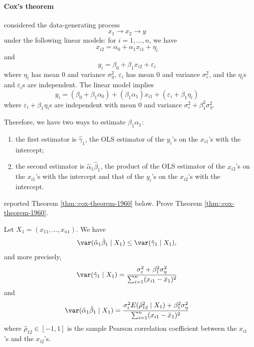 \paragraph{Cox's theorem}\label{hw11::cox-theorem1960}


\citet{cox1960jrssb} considered the data-generating process
$$
x_1 \longrightarrow x_2  \longrightarrow y
$$
under the following linear models:
for $i=1,\ldots, n$, we have 
$$
x_{i2} = \alpha_0 + \alpha_1x_{i1} + \eta_i
$$
and
$$
y_i = \beta_0 + \beta_1 x_{i2} + \varepsilon_i
$$
where $\eta_i$ has mean 0 and variance $\sigma_\eta^2$, $\varepsilon_i$ has mean 0 and variance $\sigma_\varepsilon^2$, and the $\eta_i$s and  $\varepsilon_i$s are independent.
The linear model implies
$$
y_i = (\beta_0 + \beta_1\alpha_0) + (\beta_1 \alpha_1) x_{i1} +   (\varepsilon_i  +  \beta_1  \eta_i  )
$$
where $\varepsilon_i  +  \beta_1  \eta_i$s are independent with mean 0 and variance $\sigma_\varepsilon^2 + \beta_1^2 \sigma_\eta^2$. 

Therefore, we have two ways to estimate $\beta_1 \alpha_1$:
\begin{enumerate}[label=(W\arabic*), ref=W\arabic*]
\item
the first estimator is $\hat\gamma_1$,  the OLS estimator of the $y_i$'s on the $x_{i1}$'s with the intercept; 

\item
the second estimator is $\hat\alpha_1 \hat\beta_1$, the product of the OLS estimator of the $x_{i2}$'s on the $x_{i1}$'s with the intercept and that of the $y_i$'s on the $x_{i2}$'s with the intercept. 
\end{enumerate}

\citet{cox1960jrssb} reported Theorem \ref{thm::cox-theorem-1960} below. Prove Theorem \ref{thm::cox-theorem-1960}. 

\begin{theorem}
\label{thm::cox-theorem-1960}
Let $X_1 = (x_{11}, \ldots, x_{n1})$. 
We have 
$$
\var(\hat\alpha_1 \hat\beta_1 \mid X_1) \leq \var(\hat\gamma_1\mid X_1) ,
$$
and more precisely,
$$
\var(\hat\gamma_1\mid X_1) 
= \frac{   \sigma_\varepsilon^2     + \beta_1^2  \sigma_\eta^2   }{    \sum_{i=1}^n   (x_{i1} - \bar{x}_1)^2     }
$$
and
$$
\var(\hat\alpha_1 \hat\beta_1 \mid X_1) 
= \frac{   \sigma_\varepsilon^2   E(  \hat\rho_{12}^2 \mid X_1)   + \beta_1^2  \sigma_\eta^2   }{    \sum_{i=1}^n   (x_{i1} - \bar{x}_1)^2     }
$$
where $\hat\rho_{12} \in [-1,1]$ is the sample Pearson correlation coefficient between the $x_{i1}$'s and the $x_{i2}$'s. 
\end{theorem}

